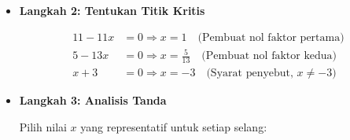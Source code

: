\documentclass[10pt,a4paper]{article}
\newcounter{eqblock}
\newcommand{\reseteq}{%
  \stepcounter{eqblock}%
  \setcounter{equation}{0}%
  \renewcommand{\theHequation}{\arabic{eqblock}.\arabic{equation}}%
}
\begin{document}
\begin{enumerate}
\begin{itemize}
\begin{itemize}
\reseteq
\begin{align}
\left|\frac{2-3x}{x+3}\right| &\geq \frac{1}{4} \quad \text{(Pertidaksamaan awal)} \\
\text{Menggunakan sifat 5: } \left|\frac{2-3x}{x+3}\right| &= \frac{|2-3x|}{|x+3|} \\
\frac{|2-3x|}{|x+3|} &\geq \frac{1}{4} \\
|2-3x| &\geq \frac{|x+3|}{4} \quad \text{(Kali kedua ruas dengan $|x+3| > 0$)} \\
4\,|2-3x| &\geq |x+3| \quad \text{(Kali kedua ruas dengan 4)} \\
|4|\,|2-3x| &\geq |x+3| \quad \text{($4>0$ dapat ditulis $4=|4|$)} \\
\text{Menggunakan sifat: } |ab| &= |a||b|,\quad |4||2-3x| \nonumber \\
&= |4(2-3x)| = |8-12x| \\
|8-12x| &\geq |x+3| \\
\text{Menggunakan sifat 4: } |a| \geq |b| &\Leftrightarrow a^2 \geq b^2 \\
(8-12x)^2 &\geq (x+3)^2 \\
(8-12x)^2 - (x+3)^2 &\geq 0 \quad \text{(Kurangi $(x+3)^2$ pada kedua ruas)} \\
\text{Menggunakan } a^2 - b^2 &= (a + b)(a - b): \\
[(8-12x) + (x+3)][(8-12x) - (x+3)] &\geq 0 \\
(8-12x + x+3)(8-12x - x-3) &\geq 0 \\
(11-11x)(5-13x) &\geq 0
\end{align}

\item \textbf{Langkah 2: Tentukan Titik Kritis}

\reseteq
\begin{align}
11-11x &= 0 \Rightarrow x = 1 \quad \text{(Pembuat nol faktor pertama)} \\
5-13x &= 0 \Rightarrow x = \frac{5}{13} \quad \text{(Pembuat nol faktor kedua)} \\
x+3 &= 0 \Rightarrow x = -3 \quad \text{(Syarat penyebut, } x \neq -3\text{)}
\end{align}

\item \textbf{Langkah 3: Analisis Tanda}

Pilih nilai $x$ yang representatif untuk setiap selang:


\end{itemize}
\end{itemize}
\end{enumerate}
\end{document}
